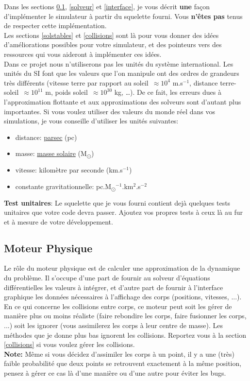 \documentclass{article}
\begin{document}
Dans les sections \ref{moteurphysique}, \ref{solveur} et \ref{interface}, je vous décrit \textbf{une} façon d'implémenter le simulateur à partir du squelette fourni. Vous \textbf{n'êtes pas} tenus de respecter cette implémentation. \\
Les sections \ref{solstables} et \ref{collisions} sont là pour vous donner des idées d'améliorations possibles  pour votre simulateur, et des pointeurs vers des ressources qui vous aideront à implémenter ces idées. \\
Dans ce projet nous n'utiliserons pas les unités du système international. Les unités du SI font que les valeurs que l'on manipule ont des ordres de grandeurs très différents (vitesse terre par rapport au soleil~${\approx 10^4}$ m.s$^{-1}$, distance terre-soleil~${\approx 10^{11}}$ m, poids soleil~${\approx 10^{30}}$ kg, \dots). De ce fait, les erreurs dues à l'approximation flottante et aux approximations des solveurs sont d'autant plus importantes. Si vous voulez utiliser des valeurs du monde réel dans vos simulations, je vous conseille d'utiliser les unités suivantes:
\begin{itemize}
    \item distance: \href{https://en.wikipedia.org/wiki/Parsec}{parsec} (pc)
    \item masse: \href{https://en.wikipedia.org/wiki/Solar_mass}{masse solaire} (M\textsubscript{\(\odot\)})
    \item vitesse: kilomètre par seconde (km.s$^{-1}$)
    \item constante gravitationnelle: pc.M\textsubscript{\(\odot\)}$^{-1}$.km$^2$.s$^{-2}$
\end{itemize}

\textbf{Test unitaires}: Le squelette que je vous fourni contient dejà quelques tests unitaires que votre code devra passer. Ajoutez vos propres tests à ceux là au fur et à mesure de votre développement.

\subsection{Moteur Physique}
\label{moteurphysique}

Le rôle du moteur physique est de calculer une approximation de la dynamique du problème. Il s'occupe d'une part de fournir au solveur d'équations différentielles les valeurs à intégrer, et d'autre part de fournir à l'interface graphique les données nécessaires à l'affichage des corps (positions, vitesses, ...). \\
En ce qui concerne les collisions entre corps, ce moteur peut soit les gérer de manière plus ou moins réaliste (faire rebondire les corps, faire fusionner les corps, ...) soit les ignorer (vous assimilerez les corps à leur centre de masse). Les méthodes que je donne plus bas ignorent les collisions. Reportez vous à la section \ref{collisions} si vous voulez gérer les collisions.\\
\textbf{Note:} Même si vous décidez d'assimiler les corps à un point, il y a une (très) faible probabilité que deux points se retrouvent exactement à la même position, pensez à gérer ce cas là d'une manière ou d'une autre pour éviter les bugs.\\
\end{document}

